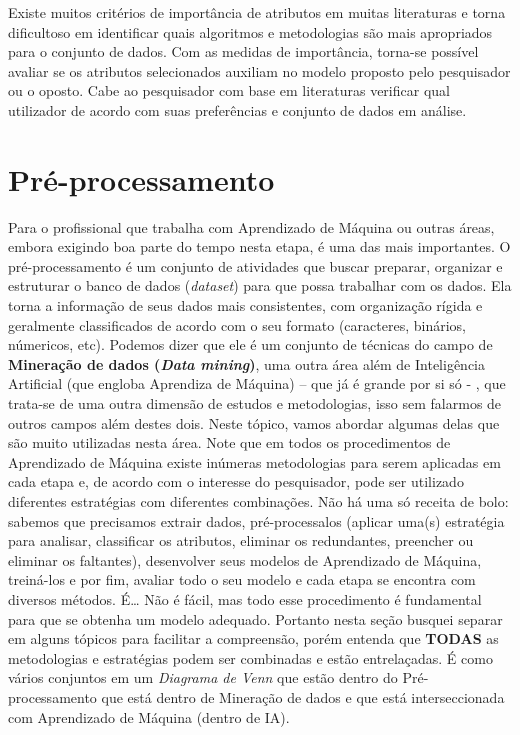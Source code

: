 \documentclass[
]{book}
\begin{document}
Existe muitos critérios de importância de atributos em muitas literaturas e torna dificultoso em identificar quais algoritmos e metodologias são mais apropriados para o conjunto de dados. Com as medidas de importância, torna-se possível avaliar se os atributos selecionados auxiliam no modelo proposto pelo pesquisador ou o oposto. Cabe ao pesquisador com base em literaturas verificar qual utilizador de acordo com suas preferências e conjunto de dados em análise.

\hypertarget{preprocesso}{%
\chapter{Pré-processamento}\label{preprocesso}}

Para o profissional que trabalha com Aprendizado de Máquina ou outras áreas, embora exigindo boa parte do tempo nesta etapa, é uma das mais importantes. O pré-processamento é um conjunto de atividades que buscar preparar, organizar e estruturar o banco de dados (\emph{dataset}) para que possa trabalhar com os dados. Ela torna a informação de seus dados mais consistentes, com organização rígida e geralmente classificados de acordo com o seu formato (caracteres, binários, númericos, etc). Podemos dizer que ele é um conjunto de técnicas do campo de \textbf{Mineração de dados (\emph{Data mining})}, uma outra área além de Inteligência Artificial (que engloba Aprendiza de Máquina) -- que já é grande por si só - , que trata-se de uma outra dimensão de estudos e metodologias, isso sem falarmos de outros campos além destes dois. Neste tópico, vamos abordar algumas delas que são muito utilizadas nesta área. Note que em todos os procedimentos de Aprendizado de Máquina existe inúmeras metodologias para serem aplicadas em cada etapa e, de acordo com o interesse do pesquisador, pode ser utilizado diferentes estratégias com diferentes combinações. Não há uma só receita de bolo: sabemos que precisamos extrair dados, pré-processalos (aplicar uma(s) estratégia para analisar, classificar os atributos, eliminar os redundantes, preencher ou eliminar os faltantes), desenvolver seus modelos de Aprendizado de Máquina, treiná-los e por fim, avaliar todo o seu modelo e cada etapa se encontra com diversos métodos. É\ldots{} Não é fácil, mas todo esse procedimento é fundamental para que se obtenha um modelo adequado. Portanto nesta seção busquei separar em alguns tópicos para facilitar a compreensão, porém entenda que \textbf{TODAS} as metodologias e estratégias podem ser combinadas e estão entrelaçadas. É como vários conjuntos em um \emph{Diagrama de Venn} que estão dentro do Pré-processamento que está dentro de Mineração de dados e que está interseccionada com Aprendizado de Máquina (dentro de IA).
\end{document}
